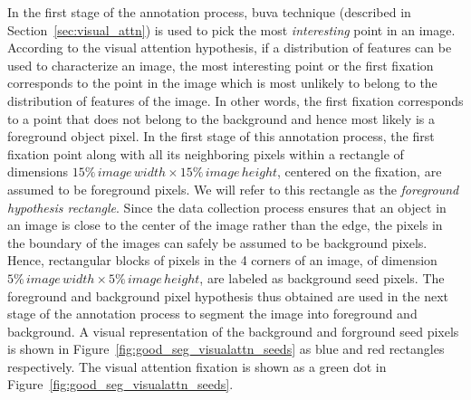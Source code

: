 \documentclass {udthesis}
\begin{document}
In the first stage of the annotation process, \gls{buva} technique (described in Section~\ref{sec:visual_attn}) is used to pick the most \textit{interesting} point in an image. According to the visual attention hypothesis, if a distribution of features can be used to characterize an image, the most interesting point or the first fixation corresponds to the point in the image which is most unlikely to belong to the distribution of features of the image. In other words, the first fixation corresponds to a point that does not belong to the background and hence most likely is a foreground object pixel. In the first stage of this annotation process, the first fixation point along with all its neighboring pixels within a rectangle of dimensions $15\% \,image\, width \times 15\% \,image\, height$, centered on the fixation, are assumed to be foreground pixels. We will refer to this rectangle as the \textit{foreground hypothesis rectangle}.
Since the data collection  process ensures that an object in an image is close to the center of the image rather than the edge, the pixels in the boundary of the images can safely be assumed to be background pixels. Hence, rectangular blocks of pixels in the 4 corners of an image, of dimension $5\% \,image\, width \times 5\% \,image\, height$, are labeled as background seed pixels. The foreground and background pixel hypothesis thus obtained are used in the next stage of the annotation process to segment the image into foreground and background. A visual representation of the background and forground seed pixels is shown in Figure~\ref{fig:good_seg_visualattn_seeds} as blue and red rectangles respectively. The visual attention fixation is shown as a green dot in Figure~\ref{fig:good_seg_visualattn_seeds}.
\end{document}
